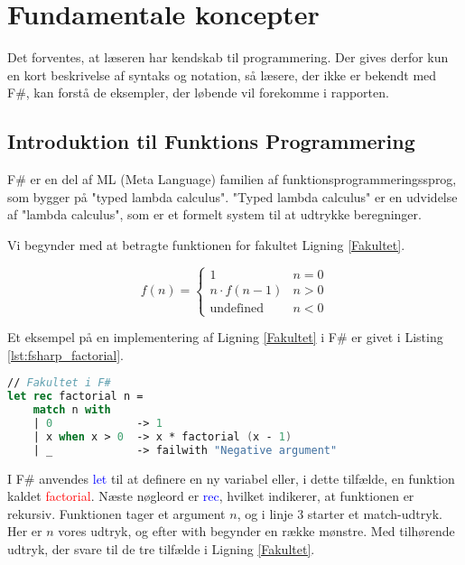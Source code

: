 
\section{Fundamentale koncepter}
Det forventes, at læseren har kendskab til programmering. Der gives derfor kun en kort beskrivelse af syntaks og notation, så læsere, der ikke er bekendt med F\#, kan forstå de eksempler, der løbende vil forekomme i rapporten. 

\subsection{Introduktion til Funktions Programmering}
F\# er en del af ML (Meta Language) familien af funktionsprogrammeringssprog, som bygger på "typed lambda calculus". "Typed lambda calculus" er en udvidelse af "lambda calculus", som er et formelt system til at udtrykke beregninger.

Vi begynder med at betragte funktionen for fakultet Ligning \eqref{Fakultet}.

\begin{equation}
    \label{Fakultet}
    f(n) = \begin{cases} 
            1 &  n = 0  \\
            n \cdot f(n-1) & n > 0 \\
            \text{undefined} & n < 0 
           \end{cases}
\end{equation}

Et eksempel på en implementering af Ligning \eqref{Fakultet} i F\# er givet i Listing \ref{lst:fsharp_factorial}.

\begin{lstlisting}[language={FSharp}, label={lst:fsharp_factorial}, caption={Eksempel på Fakultet i F\#}]
// Fakultet i F#
let rec factorial n =
    match n with
    | 0             -> 1 
    | x when x > 0  -> x * factorial (x - 1)
    | _             -> failwith "Negative argument"
\end{lstlisting}

I F\# anvendes \textcolor{blue}{let} til at definere en ny variabel eller, i dette tilfælde, en funktion kaldet \textcolor{red}{factorial}. Næste nøgleord er \textcolor{blue}{rec}, hvilket indikerer, at funktionen er rekursiv. Funktionen tager et argument \(n\), og i linje 3 starter et match-udtryk. Her er \(n\) vores udtryk, og efter \textcolor{codepurple}{with} begynder en række mønstre. Med tilhørende udtryk, der svare til de tre tilfælde i Ligning \eqref{Fakultet}. 
    
